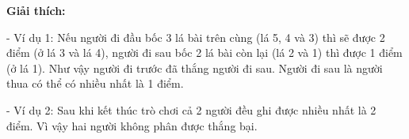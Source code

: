 \textbf{    Giải thích:   }

   - Ví dụ 1: Nếu người đi đầu bốc 3 lá bài trên cùng (lá 5, 4 và 3) thì sẽ được 2 điểm (ở lá 3 và lá 4), người đi sau bốc 2 lá bài còn lại (lá 2 và 1) thì được 1 điểm (ở lá 1). Như vậy người đi trước đã thắng người đi sau. Người đi sau là người thua có thể có nhiều nhất là 1 điểm.  

   - Ví dụ 2: Sau khi kết thúc trò chơi cả 2 người đều ghi được nhiều nhất là 2 điểm. Vì vậy hai người không phân được thắng bại.  